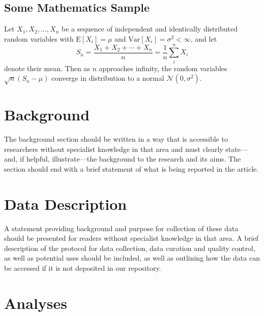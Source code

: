 \documentclass[a4paper,num-refs]{oup-contemporary}
\begin{document}
\subsection{Some Mathematics Sample}

Let $X_1, X_2, \ldots, X_n$ be a sequence of independent and identically distributed random variables with $\text{E}[X_i] = \mu$ and $\text{Var}[X_i] = \sigma^2 < \infty$, and let
%
\begin{equation}
S_n = \frac{X_1 + X_2 + \cdots + X_n}{n}
      = \frac{1}{n}\sum_{i}^{n} X_i
\end{equation}
%
denote their mean. Then as $n$ approaches infinity, the random variables $\sqrt{n}(S_n - \mu)$ converge in distribution to a normal $\mathcal{N}(0, \sigma^2)$.


\section{Background}
\label{sec:background}

The background section should be written in a way that is accessible to researchers without specialist knowledge in that area and must clearly state---and, if helpful, illustrate---the background to the research and its aims. The section should end with a brief statement of what is being reported in the article.


\section{Data Description}

A statement providing background and purpose for collection of these data should be presented for readers without specialist knowledge in that area. A brief description of the protocol for data collection, data curation and quality control, as well as potential uses should be included, as well as outlining how the data can be accessed if it is not deposited in our repository.



\section{Analyses}
\end{document}
